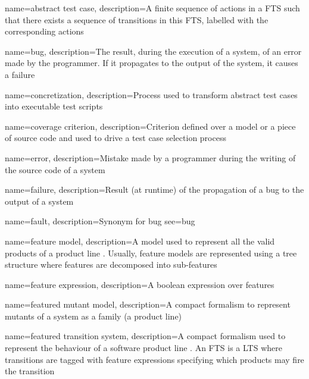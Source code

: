 




{
    name=abstract test case,
    description={A finite sequence of actions in a FTS such that there exists a sequence of transitions in this FTS, labelled with the corresponding actions}
}

{
    name=bug,
    description={The result, during the execution of a system, of an error made by the programmer. If it propagates to the output of the system, it causes a failure}
}

{
    name=concretization,
    description={Process used to transform abstract test cases into executable test scripts}
}

{
    name=coverage criterion,
    description={Criterion defined over a model or a piece of source code and used to drive a test case selection process}
}

{
    name=error,
    description={Mistake made by a programmer during the writing of the source code of a system}
}

{
    name=failure,
    description={Result (at runtime) of the propagation of a bug to the output of a system}
}

{
    name=fault,
    description={Synonym for bug}
    see={bug}
}

{
    name=feature model,
    description={A model used to represent all the valid products of a product line \cite{Kang1990}. Usually, feature models are represented using a tree structure where features are decomposed into sub-features}
}

{
    name=feature expression,
    description={A boolean expression over features}
}

{
    name=featured mutant model,
    description={A compact formalism to represent mutants of a system as a family (\ie a product line)}
}

{
    name=featured transition system,
    description={A compact formalism used to represent the behaviour of a software product line \cite{Classen2013b}. An FTS is a LTS where transitions are tagged with feature expressions specifying which products may fire the transition}
}

